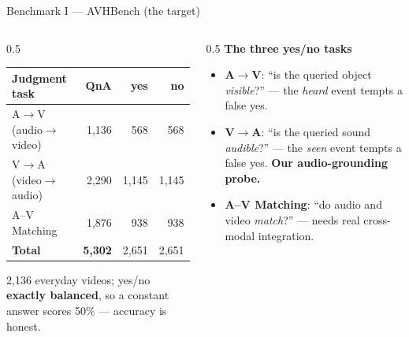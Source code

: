 \documentclass[aspectratio=169,11pt]{beamer}
\begin{document}
\begin{frame}{Benchmark I --- AVHBench (the target)}
\begin{columns}[T]
\begin{column}{0.5\textwidth}
\footnotesize
\setlength{\tabcolsep}{4pt}
\begin{tabular}{@{}lrrr@{}}
\toprule
Judgment task & QnA & yes & no \\
\midrule
A$\to$V (audio$\to$video) & 1,136 & 568 & 568 \\
V$\to$A (video$\to$audio) & 2,290 & 1,145 & 1,145 \\
A--V Matching             & 1,876 & 938 & 938 \\
\midrule
\textbf{Total}            & \textbf{5,302} & 2,651 & 2,651 \\
\bottomrule
\end{tabular}
\par\vspace{0.4em}
{\scriptsize 2,136 everyday videos; yes/no \textbf{exactly balanced}, so a constant answer scores
50\% --- accuracy is honest.}
\end{column}
\begin{column}{0.5\textwidth}\scriptsize
\textbf{The three yes/no tasks}
\begin{itemize}
\item \textbf{A$\to$V}: ``is the queried object \emph{visible}?'' --- the \emph{heard} event tempts a
false yes.
\item \textbf{V$\to$A}: ``is the queried sound \emph{audible}?'' --- the \emph{seen} event tempts a
false yes. \textbf{Our audio-grounding probe.}
\item \textbf{A--V Matching}: ``do audio and video \emph{match}?'' --- needs real cross-modal
integration.
\end{itemize}
\end{column}
\end{columns}
\end{frame}
\end{document}
